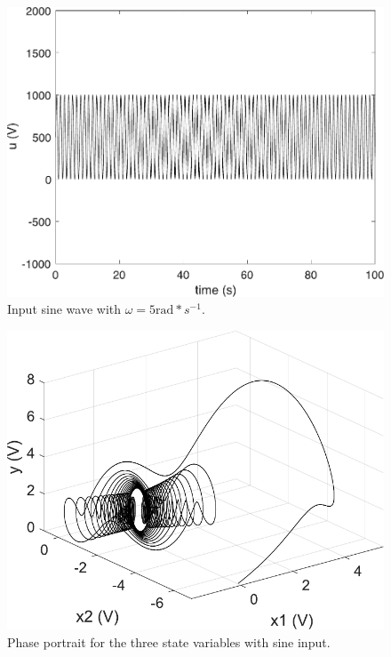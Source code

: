     \begin{figure}[H]
        \centering
        \includegraphics[scale=0.375]{figs/InputSin5f.pdf}
        \caption{Input sine wave with $\omega=5\text{rad}*s^{-1}$.}
        \label{fig:inputSin5f}
    \end{figure}
    \begin{figure}[H]
        \centering
        \includegraphics[scale=0.425]{figs/3dSine5fInput.pdf}
        \caption{Phase portrait for the three state variables with sine input.}
        \label{fig:3dSin5f}
    \end{figure}
